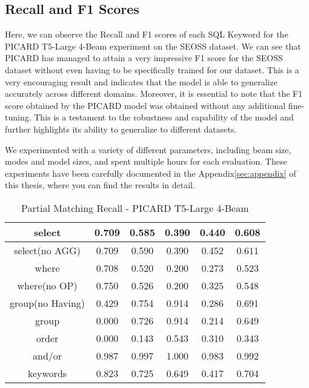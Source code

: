 \subsection{Recall and F1 Scores}

Here, we can observe the Recall and F1 scores of each SQL Keyword for the PICARD T5-Large 4-Beam experiment on the SEOSS dataset. We can see that PICARD has managed to attain a very impressive F1 score for the SEOSS dataset without even having to be specifically trained for our dataset. This is a very encouraging result and indicates that the model is able to generalize accurately across different domains. Moreover, it is essential to note that the F1 score obtained by the PICARD model was obtained without any additional fine-tuning. This is a testament to the robustness and capability of the model and further highlights its ability to generalize to different datasets.

We experimented with a variety of different parameters, including beam size, modes and model sizes, and spent multiple hours for each evaluation. These experiments have been carefully documented in the Appendix\ref{sec:appendix} of this thesis, where you can find the results in detail.


\begin{table}[h]
    \centering
    \begin{tabular}{|c|c|c|c|c|c|}
        \hline
        select           & 0.709 & 0.585 & 0.390 & 0.440 & 0.608 \\ \hline
        select(no AGG)   & 0.709 & 0.590 & 0.390 & 0.452 & 0.611 \\ \hline
        where            & 0.708 & 0.520 & 0.200 & 0.273 & 0.523 \\ \hline
        where(no OP)     & 0.750 & 0.526 & 0.200 & 0.325 & 0.548 \\ \hline
        group(no Having) & 0.429 & 0.754 & 0.914 & 0.286 & 0.691 \\ \hline
        group            & 0.000 & 0.726 & 0.914 & 0.214 & 0.649 \\ \hline
        order            & 0.000 & 0.143 & 0.543 & 0.310 & 0.343 \\ \hline
        and/or           & 0.987 & 0.997 & 1.000 & 0.983 & 0.992 \\ \hline
        keywords         & 0.823 & 0.725 & 0.649 & 0.417 & 0.704 \\ \hline
    \end{tabular}
    \caption{Partial Matching Recall - PICARD T5-Large 4-Beam}

\end{table}


